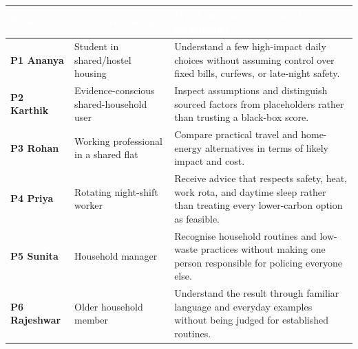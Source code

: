 \documentclass[12pt, a4paper]{article}
\begin{document}
{\small
{}
\begin{tabularx}{\textwidth}{|>{\raggedright\arraybackslash}p{2.1cm}|>{\raggedright\arraybackslash}p{3.0cm}|X|}
\hline
\rowcolor{cNavy}
\textcolor{white}{\textbf{Persona}} & \textcolor{white}{\textbf{Core circumstance}} & \textcolor{white}{\textbf{What success means for this stakeholder}} \\
\hline
\textbf{P1 Ananya} & Student in shared/hostel housing & Understand a few high-impact daily choices without assuming control over fixed bills, curfews, or late-night safety. \\
\hline
\textbf{P2 Karthik} & Evidence-conscious shared-household user & Inspect assumptions and distinguish sourced factors from placeholders rather than trusting a black-box score. \\
\hline
\textbf{P3 Rohan} & Working professional in a shared flat & Compare practical travel and home-energy alternatives in terms of likely impact and cost. \\
\hline
\textbf{P4 Priya} & Rotating night-shift worker & Receive advice that respects safety, heat, work rota, and daytime sleep rather than treating every lower-carbon option as feasible. \\
\hline
\textbf{P5 Sunita} & Household manager & Recognise household routines and low-waste practices without making one person responsible for policing everyone else. \\
\hline
\textbf{P6 Rajeshwar} & Older household member & Understand the result through familiar language and everyday examples without being judged for established routines. \\
\hline
\end{tabularx}
}
\end{document}
